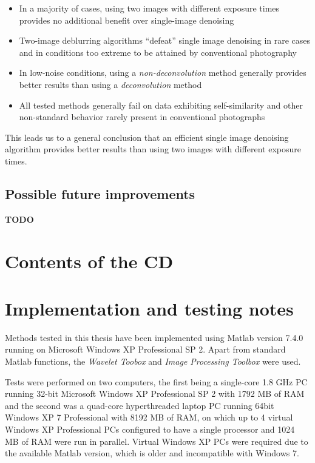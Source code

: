 \documentclass[12pt,notitlepage]{report}
\begin{document}
\begin{itemize}
\item In a majority of cases, using two images with different exposure times provides no additional benefit over single-image denoising
\item Two-image deblurring algorithms “defeat” single image denoising in rare cases and in conditions too extreme to be attained by conventional photography
\item In low-noise conditions, using a {\em non-deconvolution} method generally provides better results than using a {\em deconvolution} method
\item All tested methods generally fail on data exhibiting self-similarity and other non-standard behavior rarely present in conventional photographs
\end{itemize}

This leads us to a general conclusion that an efficient single image denoising algorithm provides better results than using two images with different exposure times. 

\section{Possible future improvements}

\textbf{TODO}

\appendix

\chapter{Contents of the CD}


\chapter{Implementation and testing notes}
\label{chap:notes}

Methods tested in this thesis have been implemented using Matlab version 7.4.0 running on Microsoft Windows XP Professional SP 2. Apart from standard Matlab functions, the {\em Wavelet Toobox} and {\em Image Processing Toolbox} were used.

Tests were performed on two computers, the first being a single-core 1.8 GHz PC running 32-bit Microsoft Windows XP Professional SP 2 with 1792 MB of RAM and the second was a quad-core hyperthreaded laptop PC running 64bit 
Windows XP 7 Professional with 8192 MB of RAM, on which up to 4 virtual Windows XP Professional PCs configured to have a single processor and 1024 MB of RAM were run in parallel. Virtual Windows XP PCs were required due to the available Matlab version, which is older and incompatible with Windows 7.
\end{document}
